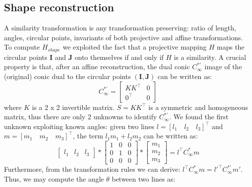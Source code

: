 \documentclass[11pt, oneside]{article}
\begin{document}
\begin{figure}[!h]
\begin{minipage}{.55\textwidth}
		\label{image_affine_reconstruction}
	\end{minipage}
\end{figure}
\pagebreak

\subsection{Shape reconstruction} \label{shape_reconstruction}
A similarity transformation is any transformation preserving: ratio of length, angles, circular points, invariants of both projective and affine transformations. To compute $H_{shape}$ we exploited the fact that a projective mapping $H$ maps the circular points $\textbf{I}$ and $\textbf{J}$ onto themselves if and only if $H$ is  a similarity. A crucial property is that, after an affine reconstruction, the dual conic $C^{*'}_\infty$ image of the (original) conic dual to the circular points $(\textbf{I},\textbf{J})$ can be written as:
\begin{equation}
	C^{*'}_\infty = 
	\begin{bmatrix}
		KK^\intercal  & 0 \\ 0^\intercal & 0
	\end{bmatrix}
\end{equation}
where $K$ is a 2 x 2 invertible matrix. $S = KK^\intercal$ is a symmetric and homogeneous matrix, thus there are only 2 unknowns to identify $C^{*'}_\infty$. We found the first unknown exploiting known angles: given two lines $l = [l_1\quad l_2 \quad l_3]^\intercal$ and $m = [m_1\quad m_2 \quad m_3]^\intercal$, the term $l_1 m_1 + l_2 m_2$ can be written as:
\begin{equation}
	\begin{bmatrix}
		l_1 & l_2 & l_3
	\end{bmatrix}
	*
	\begin{bmatrix}
		1 & 0 & 0 \\ 0 & 1 & 0 \\ 0 & 0 & 0
	\end{bmatrix} *
	\begin{bmatrix}
		m_1 \\ m_2 \\ m_3
	\end{bmatrix}
	= l^\intercal C^{*}_\infty m
\end{equation}
Furthermore, from the transformation rules we can derive: $l^\intercal C^{*}_\infty m = l{'^\intercal} C^{*'}_\infty m'$. Thus, we may compute the angle $\theta$ between two lines as:
\end{document}
